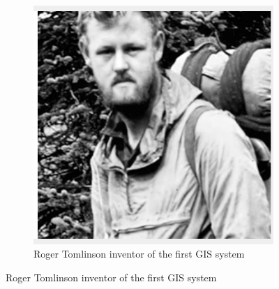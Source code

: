 \documentclass[10pt, conference, compsocconf]{IEEEtran}
\begin{document}
\begin{figure}[h]
\centering
\begin{subfigure}[b]{0.4\textwidth}
\centering
\includegraphics[scale=.3]{images/guy.png}
\caption{Roger Tomlinson inventor of the first GIS system}
\label{fig:guy}
\end{subfigure}
\end{figure}
\end{document}
